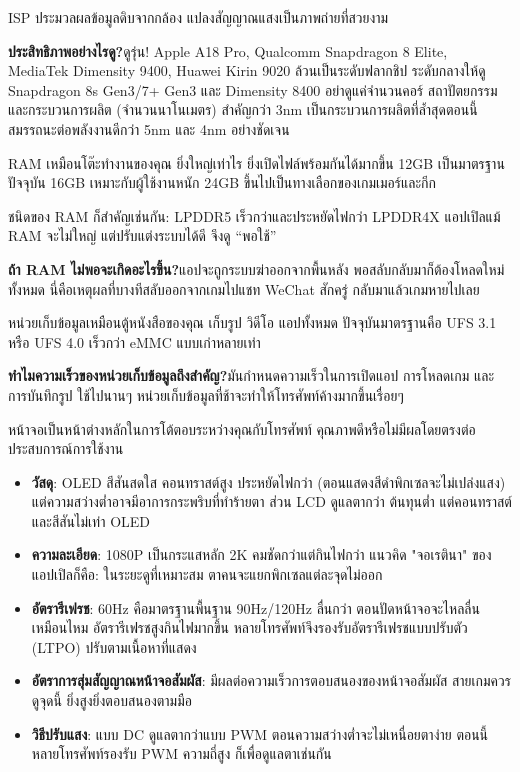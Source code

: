 
ISP ประมวลผลข้อมูลดิบจากกล้อง แปลงสัญญาณแสงเป็นภาพถ่ายที่สวยงาม

\textbf{ประสิทธิภาพอย่างไรดู?}ดูรุ่น! Apple A18 Pro, Qualcomm Snapdragon 8 Elite, MediaTek Dimensity 9400, Huawei Kirin 9020 ล้วนเป็นระดับฟลากชิป ระดับกลางให้ดู Snapdragon 8s Gen3/7+ Gen3 และ Dimensity 8400 อย่าดูแค่จำนวนคอร์ สถาปัตยกรรมและกระบวนการผลิต (จำนวนนาโนเมตร) สำคัญกว่า 3nm เป็นกระบวนการผลิตที่ล้ำสุดตอนนี้ สมรรถนะต่อพลังงานดีกว่า 5nm และ 4nm อย่างชัดเจน


RAM เหมือนโต๊ะทำงานของคุณ ยิ่งใหญ่เท่าไร ยิ่งเปิดไฟล์พร้อมกันได้มากขึ้น 12GB เป็นมาตรฐานปัจจุบัน 16GB เหมาะกับผู้ใช้งานหนัก 24GB ขึ้นไปเป็นทางเลือกของเกมเมอร์และกีก

ชนิดของ RAM ก็สำคัญเช่นกัน: LPDDR5 เร็วกว่าและประหยัดไฟกว่า LPDDR4X แอปเปิลแม้ RAM จะไม่ใหญ่ แต่ปรับแต่งระบบได้ดี จึงดู “พอใช้”

\textbf{ถ้า RAM ไม่พอจะเกิดอะไรขึ้น?}แอปจะถูกระบบฆ่าออกจากพื้นหลัง พอสลับกลับมาก็ต้องโหลดใหม่ทั้งหมด นี่คือเหตุผลที่บางทีสลับออกจากเกมไปแชท WeChat สักครู่ กลับมาแล้วเกมหายไปเลย


หน่วยเก็บข้อมูลเหมือนตู้หนังสือของคุณ เก็บรูป วิดีโอ แอปทั้งหมด ปัจจุบันมาตรฐานคือ UFS 3.1 หรือ UFS 4.0 เร็วกว่า eMMC แบบเก่าหลายเท่า

\textbf{ทำไมความเร็วของหน่วยเก็บข้อมูลถึงสำคัญ?}มันกำหนดความเร็วในการเปิดแอป การโหลดเกม และการบันทึกรูป ใช้ไปนานๆ หน่วยเก็บข้อมูลที่ช้าจะทำให้โทรศัพท์ค้างมากขึ้นเรื่อยๆ


หน้าจอเป็นหน้าต่างหลักในการโต้ตอบระหว่างคุณกับโทรศัพท์ คุณภาพดีหรือไม่มีผลโดยตรงต่อประสบการณ์การใช้งาน

\begin{itemize}
  \item \textbf{วัสดุ}: OLED สีสันสดใส คอนทราสต์สูง ประหยัดไฟกว่า (ตอนแสดงสีดำพิกเซลจะไม่เปล่งแสง) แต่ความสว่างต่ำอาจมีอาการกระพริบที่ทำร้ายตา ส่วน LCD ดูแลตากว่า ต้นทุนต่ำ แต่คอนทราสต์และสีสันไม่เท่า OLED
  \item \textbf{ความละเอียด}: 1080P เป็นกระแสหลัก 2K คมชัดกว่าแต่กินไฟกว่า แนวคิด "จอเรตินา" ของแอปเปิลก็คือ: ในระยะดูที่เหมาะสม ตาคนจะแยกพิกเซลแต่ละจุดไม่ออก
  \item \textbf{อัตรารีเฟรช}: 60Hz คือมาตรฐานพื้นฐาน 90Hz/120Hz ลื่นกว่า ตอนปัดหน้าจอจะไหลลื่นเหมือนไหม อัตรารีเฟรชสูงกินไฟมากขึ้น หลายโทรศัพท์จึงรองรับอัตรารีเฟรชแบบปรับตัว (LTPO) ปรับตามเนื้อหาที่แสดง
  \item \textbf{อัตราการสุ่มสัญญาณหน้าจอสัมผัส}: มีผลต่อความเร็วการตอบสนองของหน้าจอสัมผัส สายเกมควรดูจุดนี้ ยิ่งสูงยิ่งตอบสนองตามมือ
  \item \textbf{วิธีปรับแสง}: แบบ DC ดูแลตากว่าแบบ PWM ตอนความสว่างต่ำจะไม่เหนื่อยตาง่าย ตอนนี้หลายโทรศัพท์รองรับ PWM ความถี่สูง ก็เพื่อดูแลตาเช่นกัน
\end{itemize}

